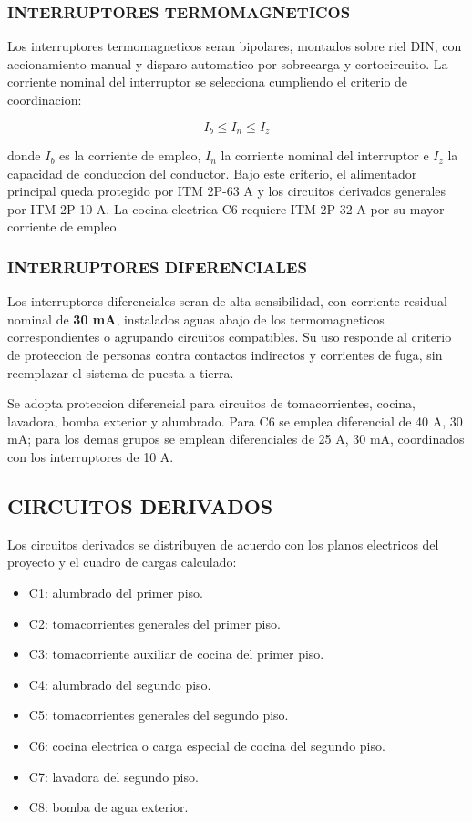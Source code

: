 \subsubsection{INTERRUPTORES TERMOMAGNETICOS}

Los interruptores termomagneticos seran bipolares, montados sobre riel DIN, con accionamiento manual y disparo automatico por sobrecarga y cortocircuito. La corriente nominal del interruptor se selecciona cumpliendo el criterio de coordinacion:

\[
I_b \leq I_n \leq I_z
\]

donde \(I_b\) es la corriente de empleo, \(I_n\) la corriente nominal del interruptor e \(I_z\) la capacidad de conduccion del conductor. Bajo este criterio, el alimentador principal queda protegido por ITM 2P-63 A y los circuitos derivados generales por ITM 2P-10 A. La cocina electrica C6 requiere ITM 2P-32 A por su mayor corriente de empleo.

\subsubsection{INTERRUPTORES DIFERENCIALES}

Los interruptores diferenciales seran de alta sensibilidad, con corriente residual nominal de \textbf{30 mA}, instalados aguas abajo de los termomagneticos correspondientes o agrupando circuitos compatibles. Su uso responde al criterio de proteccion de personas contra contactos indirectos y corrientes de fuga, sin reemplazar el sistema de puesta a tierra.

Se adopta proteccion diferencial para circuitos de tomacorrientes, cocina, lavadora, bomba exterior y alumbrado. Para C6 se emplea diferencial de 40 A, 30 mA; para los demas grupos se emplean diferenciales de 25 A, 30 mA, coordinados con los interruptores de 10 A.

\subsection{CIRCUITOS DERIVADOS}

Los circuitos derivados se distribuyen de acuerdo con los planos electricos del proyecto y el cuadro de cargas calculado:

\begin{itemize}
  \item C1: alumbrado del primer piso.
  \item C2: tomacorrientes generales del primer piso.
  \item C3: tomacorriente auxiliar de cocina del primer piso.
  \item C4: alumbrado del segundo piso.
  \item C5: tomacorrientes generales del segundo piso.
  \item C6: cocina electrica o carga especial de cocina del segundo piso.
  \item C7: lavadora del segundo piso.
  \item C8: bomba de agua exterior.
\end{itemize}


